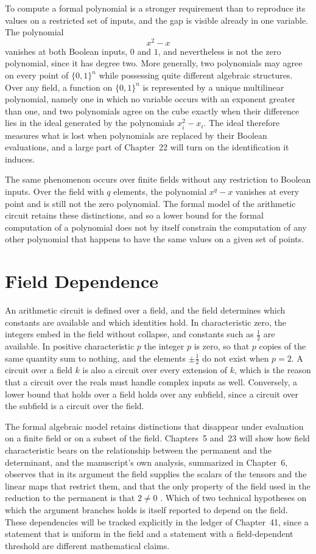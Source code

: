 \documentclass[11pt,letterpaper]{report}
\theoremstyle{plain}
\theoremstyle{definition}
\theoremstyle{remark}
\begin{document}
To compute a formal polynomial is a stronger requirement than to reproduce its values on a restricted set of inputs, and the gap is visible already in one variable. The polynomial
\[
x^{2}-x
\]
vanishes at both Boolean inputs, $0$ and $1$, and nevertheless is not the zero polynomial, since it has degree two. More generally, two polynomials may agree on every point of $\{0,1\}^n$ while possessing quite different algebraic structures. Over any field, a function on $\{0,1\}^n$ is represented by a unique multilinear polynomial, namely one in which no variable occurs with an exponent greater than one, and two polynomials agree on the cube exactly when their difference lies in the ideal generated by the polynomials $x_i^2-x_i$. The ideal therefore measures what is lost when polynomials are replaced by their Boolean evaluations, and a large part of Chapter~22 will turn on the identification it induces.

The same phenomenon occurs over finite fields without any restriction to Boolean inputs. Over the field with $q$ elements, the polynomial $x^q-x$ vanishes at every point and is still not the zero polynomial. The formal model of the arithmetic circuit retains these distinctions, and so a lower bound for the formal computation of a polynomial does not by itself constrain the computation of any other polynomial that happens to have the same values on a given set of points.

\section{Field Dependence}

An arithmetic circuit is defined over a field, and the field determines which constants are available and which identities hold. In characteristic zero, the integers embed in the field without collapse, and constants such as $\tfrac12$ are available. In positive characteristic $p$ the integer $p$ is zero, so that $p$ copies of the same quantity sum to nothing, and the elements $\pm\tfrac12$ do not exist when $p=2$. A circuit over a field $k$ is also a circuit over every extension of $k$, which is the reason that a circuit over the reals must handle complex inputs as well. Conversely, a lower bound that holds over a field holds over any subfield, since a circuit over the subfield is a circuit over the field.

The formal algebraic model retains distinctions that disappear under evaluation on a finite field or on a subset of the field. Chapters~5 and~23 will show how field characteristic bears on the relationship between the permanent and the determinant, and the manuscript's own analysis, summarized in Chapter~6, observes that in its argument the field supplies the scalars of the tensors and the linear maps that restrict them, and that the only property of the field used in the reduction to the permanent is that $2\neq0$ \cite{Source2026}. Which of two technical hypotheses on which the argument branches holds is itself reported to depend on the field. These dependencies will be tracked explicitly in the ledger of Chapter~41, since a statement that is uniform in the field and a statement with a field-dependent threshold are different mathematical claims.
\end{document}
